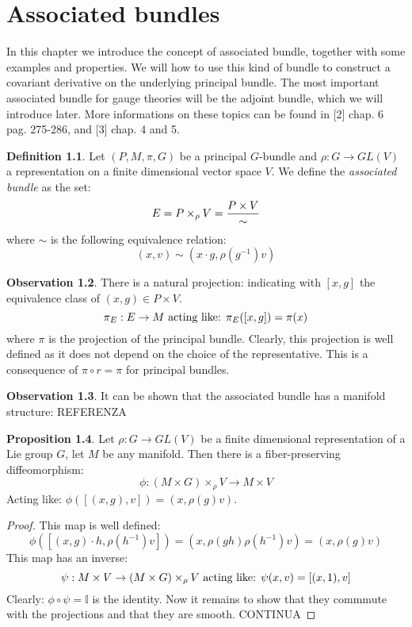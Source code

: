 \documentclass[12pt,a4paper]{report}
\theoremstyle{definition}
\newtheorem{Def}{Definition}[chapter]
\theoremstyle{Theorem}
\newtheorem{Prop}[Def]{Proposition}
\theoremstyle{definition}
\theoremstyle{definition}
\newtheorem{Obs}[Def]{Observation}
\begin{document}
	\chapter{Associated bundles}
	In this chapter we introduce the concept of associated bundle, together with some examples and properties. We will how to use this kind of bundle to construct a covariant derivative on the underlying principal bundle. The most important associated bundle for gauge theories will be the adjoint bundle, which we will introduce later. More informations on these topics can be found in [2] chap. 6 pag. 275-286, and [3] chap. 4 and 5.
	\begin{Def}
		Let $(P,M,\pi,G)$ be a principal $G$-bundle and $\rho:G\rightarrow GL(V)$ a representation on a finite dimensional vector space $V$. We define the \textit{associated bundle} as the set: 
		$$E=P\times_\rho V={P\times V\over \sim}$$
		where $\sim$ is the following equivalence relation:
		$$(x,v)\sim(x\cdot g,\rho(g^{-1})v)$$ 
	\end{Def}
	\begin{Obs}
		There is a natural projection: indicating with $[x,g]$ the equivalence class of $(x,g)\in P\times V$.
		$$\pi_E:E\rightarrow M\hbox{ acting like: }\pi_E([x,g])=\pi(x)$$
		where $\pi$ is the projection of the principal bundle. Clearly, this projection is well defined as it does not depend on the choice of the representative. This is a consequence of $\pi\circ r=\pi$ for principal bundles.
	\end{Obs}
	\begin{Obs}
		It can be shown that the associated bundle has a manifold structure: REFERENZA
	\end{Obs}
	\begin{Prop}\label{Prop_6.1.1}
		Let $\rho:G\rightarrow GL(V)$ be a finite dimensional representation of a Lie group $G$, let $M$ be any manifold. Then there is a fiber-preserving diffeomorphism:
		$$\phi:(M\times G)\times_\rho V\rightarrow M\times V$$
		Acting like: $\phi([(x,g),v])=(x,\rho(g)v)$.
	\end{Prop}
	\begin{proof}
		This map is well defined:
		$$\phi([(x,g)\cdot h,\rho(h^{-1})v])=(x,\rho(gh)\rho(h^{-1})v)=(x,\rho(g)v)$$
		This map has an inverse:
		$$\psi:M\times V\rightarrow (M\times G)\times_\rho V\hbox{ acting like: }
		\psi(x,v)=[(x,1),v]$$
		Clearly: $\phi\circ \psi=\mathbb{I}$ is the identity. Now it remains to show that they commmute with the projections and that they are smooth. CONTINUA
	\end{proof}
\end{document}
